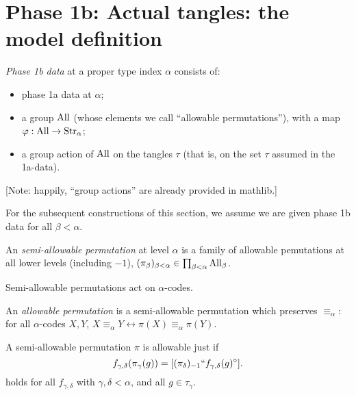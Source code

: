 \section{Phase 1b: Actual tangles: the model definition}

\begin{definition}
  \label{def:phase-1b-data}
  \emph{Phase 1b data} at a proper type index $\alpha$ consists of:
  \begin{itemize}
  \item phase 1a data at $\alpha$;
  \item a group $\mathrm{All}$ (whose elements we call “allowable permutations”), with a map $\varphi : \mathrm{All} \to \mathrm{Str}_\alpha$;
  \item a group action of $\mathrm{All}$ on the tangles $\tau$ (that is, on the set $\tau$ assumed in the 1a-data).
  \end{itemize}
  [Note: happily, “group actions” are already provided in mathlib.]

  For the subsequent constructions of this section, we assume we are given phase 1b data for all $\beta < \alpha$.
\end{definition}

\begin{definition}
\label {def:semiallowable-perm}
  An \emph{semi-allowable permutation} at level $\alpha$ is a family of allowable pemutations at all lower levels (including $-1$), $(\pi_\beta)_{\beta < \alpha} \in \prod_{\beta < \alpha} \mathrm{All}_\beta$.
\end{definition}

\begin{definition}
  \label{def:codes-action}
  Semi-allowable permutations act on $\alpha$-codes.
\end{definition}

\begin{definition}
  \label{def:allowable-perm}
  An \emph{allowable permutation} is a semi-allowable permutation which preserves $\equiv_\alpha$: for all $\alpha$-codes $X,Y$, $X \equiv_\alpha Y \leftrightarrow \pi(X) \equiv_\alpha \pi(Y)$.
\end{definition}

\begin{lemma}
\label {lem:coherence-unpacked}
A semi-allowable permutation $\pi$ is allowable just if
$$f_{\gamma,\delta}(\pi_\gamma(g)) = [(\pi_\delta)_{-1}``f_{\gamma,\delta}(g)^\circ].$$
holds for all $f_{\gamma,\delta}$ with $\gamma,\delta<\alpha$, and all $g \in \tau_\gamma$.
\end{lemma}


